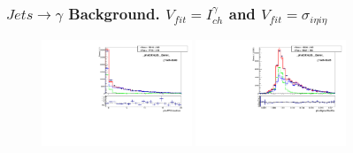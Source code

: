 \begin{frame}\frametitle{$Jets \rightarrow \gamma$ Background. $V_{fit}=I_{ch}^{\gamma}$ and $V_{fit}=\sigma_{i\eta{i\eta}}$}
  \begin{figure}[htb]
    \begin{center}
       \includegraphics[width=0.40\textwidth]{../figs/figs_v11/MUON_WGamma/TemplateFits/c_TEMPL_CHISO_UNblind__phoEt15to20__Barrel__RooFit.pdf} \includegraphics[width=0.40\textwidth]{../figs/figs_v11/MUON_WGamma/TemplateFits/c_TEMPL_SIHIH_UNblind__phoEt15to20__Barrel__RooFit.pdf}
    \end{center}
  \end{figure}
\end{frame}%
